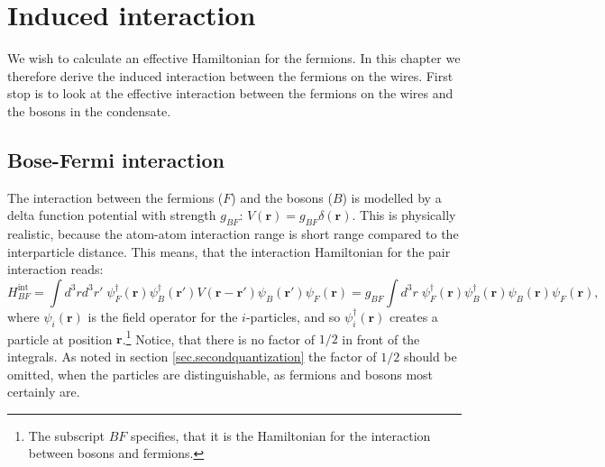
\chapter{Induced interaction} %

\label{Chapter3} %


We wish to calculate an effective Hamiltonian for the fermions. In this chapter we therefore derive the induced interaction between the fermions on the wires. First stop is to look at the effective interaction between the fermions on the wires and the bosons in the condensate.

\section{Bose-Fermi interaction}
The interaction between the fermions ($F$) and the bosons ($B$) is modelled by a delta function potential with strength $g_{BF}$: $V(\mathbf{r})=g_{BF}\delta(\mathbf{r})$. This is physically realistic, because the atom-atom interaction range is short range compared to the interparticle distance. This means, that the interaction Hamiltonian for the pair interaction reads:
\begin{equation}
H_{BF}^\text{int}  = \int d^3 r d^3 r' \; \psi_F^\dagger(\mathbf{r}) \psi_B^\dagger(\mathbf{r}')V(\mathbf{r}-\mathbf{r}')\psi_B(\mathbf{r}')\psi_F(\mathbf{r}) = g_{BF}\int d^3 r \; \psi_F^\dagger(\mathbf{r}) \psi_B^\dagger(\mathbf{r})\psi_B(\mathbf{r})\psi_F(\mathbf{r}),
\label{eq.HintBF}
\end{equation}
where $\psi_i(\mathbf{r})$ is the field operator for the $i$-particles, and so $\psi_i^\dagger(\mathbf{r})$ creates a particle at position $\mathbf{r}$.\footnote{The subscript $BF$ specifies, that it is the Hamiltonian for the interaction between bosons and fermions.} Notice, that there is no factor of $1/2$ in front of the integrals. As noted in section \ref{sec.secondquantization} the factor of $1/2$ should be omitted, when the particles are distinguishable, as fermions and bosons most certainly are. 

